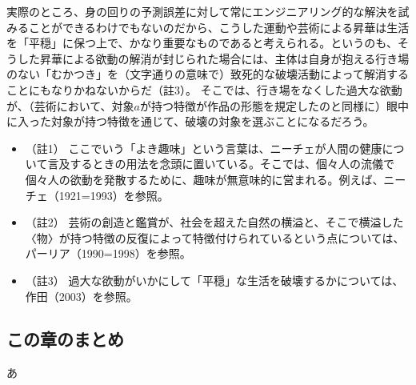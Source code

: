 実際のところ、身の回りの予測誤差に対して常にエンジニアリング的な解決を試みることができるわけでもないのだから、こうした運動や芸術による昇華は生活を「平穏」に保つ上で、かなり重要なものであると考えられる。というのも、そうした昇華による欲動の解消が封じられた場合には、主体は自身が抱える行き場のない「むかつき」を（文字通りの意味で）致死的な破壊活動によって解消することにもなりかねないからだ（註3）。
そこでは、行き場をなくした過大な欲動が、（芸術において、対象\(a\)が持つ特徴が作品の形態を規定したのと同様に）眼中に入った対象が持つ特徴を通じて、破壊の対象を選ぶことになるだろう。

\begin{itemize}
\tightlist
\item
  （註1）
  ここでいう「よき趣味」という言葉は、ニーチェが人間の健康について言及するときの用法を念頭に置いている。そこでは、個々人の流儀で個々人の欲動を発散するために、趣味が無意味的に営まれる。例えば、ニーチェ（1921=1993）\cite{Nietzsche3}を参照。
\item
  （註2）
  芸術の創造と鑑賞が、社会を超えた自然の横溢と、そこで横溢した〈物〉が持つ特徴の反復によって特徴付けられているという点については、パーリア（1990=1998）\cite{Paglia}を参照。
\item
  （註3）
  過大な欲動がいかにして「平穏」な生活を破壊するかについては、作田（2003）\cite{Sakuta}を参照。
\end{itemize}

\subsection{この章のまとめ}\label{ux3053ux306eux7ae0ux306eux307eux3068ux3081}

あ
